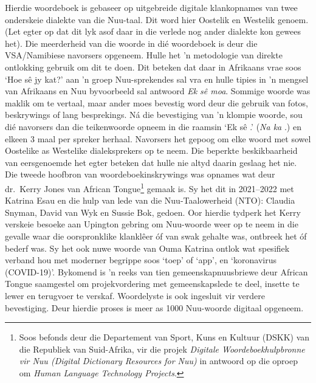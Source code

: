 Hierdie woordeboek is gebaseer op uitgebreide digitale klankopnames
van twee onderskeie dialekte van die N\textipa{\textvertline}uu-taal.
Dit word hier Oostelik en Westelik genoem. (Let egter op dat dit lyk
asof daar in die verlede nog ander dialekte kon gewees het). Die
meerderheid van die woorde in di\'{e} woordeboek is deur die
VSA/Namibiese navorsers opgeneem. Hulle het 'n metodologie van direkte
ontlokking gebruik om dit te doen. Dit beteken dat daar in Afrikaans
vrae soos `Hoe s\^{e} jy kat?' aan 'n groep
N\textipa{\textvertline}uu-sprekendes sal vra en hulle tipies in 'n
mengsel van Afrikaans en N\textipa{\textvertline}uu byvoorbeeld sal
antwoord \emph{Ek s\^{e} moa}. Sommige woorde was maklik
om te vertaal, maar ander moes bevestig word deur die gebruik van
fotos, beskrywings of lang besprekings. N\'{a} die bevestiging van 'n
klompie woorde, sou di\'{e} navorsers dan die teikenwoorde opneem in
die raamsin `Ek s\^{e} \underline{\hspace{1cm}}.' (\emph{Na ka}
\underline{\hspace{1cm}}.) en elkeen 3 maal per spreker herhaal.
Navorsers het gepoog om elke woord met sowel Oostelike as Westelike
dialeksprekers op te neem. Die beperkte beskikbaarheid van
eersgenoemde het egter beteken dat hulle nie altyd daarin geslaag het
nie.\\

Die tweede hoofbron van woordeboekinskrywings was opnames wat deur
dr.\ Kerry Jones van African Tongue\footnote{Soos befonds deur die
Departement van Sport, Kuns en Kultuur (DSKK) van die Republiek van
Suid-Afrika, vir die projek \emph{Digitale Woordeboekhulpbronne vir
N\textipa{\textvertline}uu (Digital Dictionary Resources for
N\textipa{\textvertline}uu)} in antwoord op die oproep om \emph{Human
Language Technology Projects}.} gemaak is. Sy het dit in 2021--2022
met Katrina Esau en die hulp van lede van die
N\textipa{\textvertline}uu-Taalowerheid (NTO): Claudia Snyman, David
van Wyk en Sussie Bok, gedoen. Oor hierdie tydperk het Kerry verskeie
besoeke aan Upington gebring om N\textipa{\textvertline}uu-woorde weer
op te neem in die gevalle waar die oorspronklike klankl\^{e}er \'{o}f
van swak gehalte was, ontbreek het \'{o}f bederf was. Sy het ook nuwe
woorde van Ouma Katrina ontlok wat spesifiek verband hou met moderner
begrippe soos `toep' of `app', en `koronavirus (COVID-19)'. Bykomend
is 'n reeks van tien gemeenskapnuusbriewe deur African Tongue
saamgestel om projekvordering met gemeenskapslede te deel, insette te
lewer en terugvoer te verskaf. Woordelyste is ook ingesluit vir
verdere bevestiging. Deur hierdie proses is meer as 1000
N\textipa{\textvertline}uu-woorde digitaal opgeneem.\\

